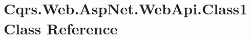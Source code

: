 \hypertarget{classCqrs_1_1Web_1_1AspNet_1_1WebApi_1_1Class1}{}\section{Cqrs.\+Web.\+Asp\+Net.\+Web\+Api.\+Class1 Class Reference}
\label{classCqrs_1_1Web_1_1AspNet_1_1WebApi_1_1Class1}

